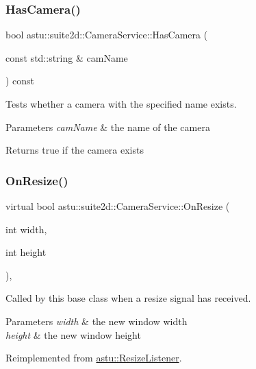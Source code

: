 \subsubsection{\texorpdfstring{Has\+Camera()}{HasCamera()}}
{\footnotesize\ttfamily bool astu\+::suite2d\+::\+Camera\+Service\+::\+Has\+Camera (\begin{DoxyParamCaption}\item[{const std\+::string \&}]{cam\+Name }\end{DoxyParamCaption}) const}

Tests whether a camera with the specified name exists.


\begin{DoxyParams}{Parameters}
{\em cam\+Name} & the name of the camera \\
\hline
\end{DoxyParams}
\begin{DoxyReturn}{Returns}
{\ttfamily true} if the camera exists 
\end{DoxyReturn}
\mbox{\label{classastu_1_1suite2d_1_1CameraService_a4229a725df31a9e416240f4b32040cdd}} 
\subsubsection{\texorpdfstring{On\+Resize()}{OnResize()}}
{\footnotesize\ttfamily virtual bool astu\+::suite2d\+::\+Camera\+Service\+::\+On\+Resize (\begin{DoxyParamCaption}\item[{int}]{width,  }\item[{int}]{height }\end{DoxyParamCaption})\hspace{0.3cm}{\ttfamily [override]}, {\ttfamily [virtual]}}

Called by this base class when a resize signal has received.


\begin{DoxyParams}{Parameters}
{\em width} & the new window width \\
\hline
{\em height} & the new window height \\
\hline
\end{DoxyParams}


Reimplemented from \hyperlink{classastu_1_1ResizeListener_a34f14538388fdd36713cd1097dcf5fb1}{astu\+::\+Resize\+Listener}.

